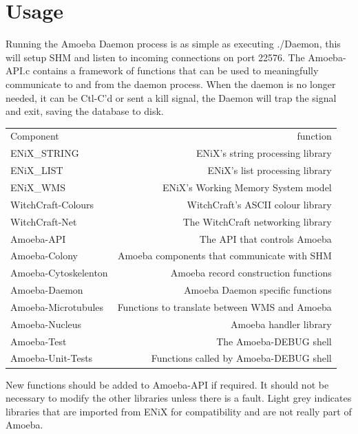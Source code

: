 \documentclass[11pt]{article}
\begin{document}
\section{Usage}
Running the Amoeba Daemon process is as simple as executing ./Daemon, this will setup SHM and listen to incoming connections on port 22576. The Amoeba-API.c contains a framework of functions that can be used to meaningfully communicate to and from the daemon process. When the daemon is no longer needed, it can be Ctl-C'd or sent a kill signal, the Daemon will trap the signal and exit, saving the database to disk.
\newpage
\noindent
\begin{center}
\begin{tabular}{l  r }
\rowcolor[gray]{0.8}
Component & function\\
\rowcolor[gray]{0.9}
ENiX\_STRING & ENiX's string processing library\\
\rowcolor[gray]{0.9}
ENiX\_LIST & ENiX's list processing library \\
\rowcolor[gray]{0.9}
ENiX\_WMS & ENiX's Working Memory System model \\
\rowcolor[gray]{0.9}
WitchCraft-Colours & WitchCraft's ASCII colour library\\
\rowcolor[gray]{0.9}
WitchCraft-Net & The WitchCraft networking library\\
Amoeba-API & The API that controls Amoeba\\
Amoeba-Colony& Amoeba components that communicate with SHM \\
Amoeba-Cytoskelenton& Amoeba record construction functions \\
Amoeba-Daemon&Amoeba Daemon specific functions \\
Amoeba-Microtubules&Functions to translate between WMS and Amoeba \\
Amoeba-Nucleus&Amoeba handler library \\
Amoeba-Test&The Amoeba-DEBUG shell \\
Amoeba-Unit-Tests& Functions called by Amoeba-DEBUG shell \\
\end{tabular}
\end{center}
\noindent
\newline
New functions should be added to Amoeba-API if required. It should not be necessary to modify the other libraries unless there is a fault. Light grey indicates libraries that are imported from ENiX for compatibility and are not really part of Amoeba.
\end{document}
